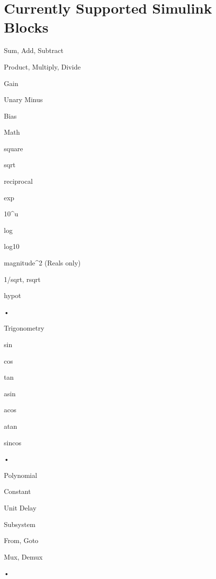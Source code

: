 \documentclass[12pt]{report}
\newenvironment{itemize*}
  {\begin{itemize}
    \setlength{\itemsep}{1pt}
    \setlength{\parskip}{1pt}}
  {\end{itemize}}
\begin{document}
\section{Currently Supported Simulink Blocks}
\begin{multicols}{2}
\begin{itemize*}	
\item Sum, Add, Subtract 
\item Product, Multiply, Divide
\item Gain
\item Unary Minus
\item Bias
\item Math
\vspace{-5pt}
	\begin{itemize*}
	\item square
	\item sqrt
	\item reciprocal
	\item exp
	\item 10\string^u
	\item log
	\item log10
	\item magnitude\string^2 (Reals only)
	\item 1/sqrt, rsqrt
	\item hypot
	\end{itemize*}•
\item Trigonometry
\vspace{-5pt}
	\begin{itemize*}
	\item sin
	\item cos
	\item tan
	\item asin
	\item acos
	\item atan
	\item sincos
	\end{itemize*}•
\item Polynomial
\item Constant
\item Unit Delay
\item Subsystem
\item From, Goto
\item Mux, Demux
\end{itemize*}•

\end{multicols}
\end{document}
